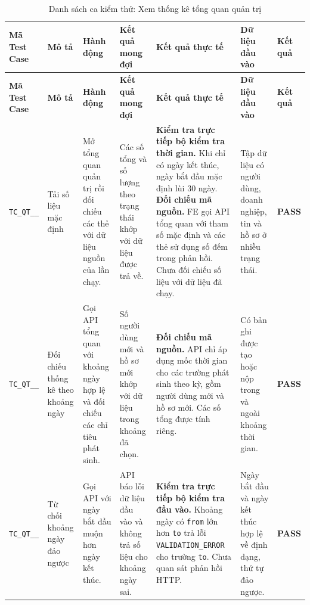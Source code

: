\begin{landscape}
{
\fontsize{9.5}{11.5}\selectfont
\setlength{\tabcolsep}{3pt}
\renewcommand{\arraystretch}{1.2}
\begin{longtable}{|>{\raggedright\arraybackslash}p{2.1cm}|>{\raggedright\arraybackslash}p{2.8cm}|>{\raggedright\arraybackslash}p{3.8cm}|>{\raggedright\arraybackslash}p{4.0cm}|>{\raggedright\arraybackslash}p{5.0cm}|>{\raggedright\arraybackslash}p{3.2cm}|>{\centering\arraybackslash}p{1.3cm}|}
    \caption{Danh sách ca kiểm thử: Xem thống kê tổng quan quản trị} \label{tab:ts-qt-04} \\
    \hline
    \textbf{Mã Test Case} & \textbf{Mô tả} & \textbf{Hành động} & \textbf{Kết quả mong đợi} & \textbf{Kết quả thực tế} & \textbf{Dữ liệu đầu vào} & \textbf{Kết quả} \\
    \hline
    \endfirsthead
    \hline
    \textbf{Mã Test Case} & \textbf{Mô tả} & \textbf{Hành động} & \textbf{Kết quả mong đợi} & \textbf{Kết quả thực tế} & \textbf{Dữ liệu đầu vào} & \textbf{Kết quả} \\
    \hline
    \endhead
    \hline
    \endfoot
    \hline
    \endlastfoot
    \texttt{TC\_\allowbreak QT\_\allowbreak 04\_\allowbreak 01} & Tải số liệu mặc định & Mở tổng quan quản trị rồi đối chiếu các thẻ với dữ liệu nguồn của lần chạy. & Các số tổng và số lượng theo trạng thái khớp với dữ liệu được trả về. & \textbf{Kiểm tra trực tiếp bộ kiểm tra thời gian.} Khi chỉ có ngày kết thúc, ngày bắt đầu mặc định lùi 30 ngày. \textbf{Đối chiếu mã nguồn.} FE gọi API tổng quan với tham số mặc định và các thẻ sử dụng số đếm trong phản hồi. Chưa đối chiếu số liệu với dữ liệu đã chạy. & Tập dữ liệu có người dùng, doanh nghiệp, tin và hồ sơ ở nhiều trạng thái. & \textbf{PASS} \\
    \hline
    \texttt{TC\_\allowbreak QT\_\allowbreak 04\_\allowbreak 02} & Đối chiếu thống kê theo khoảng ngày & Gọi API tổng quan với khoảng ngày hợp lệ và đối chiếu các chỉ tiêu phát sinh. & Số người dùng mới và hồ sơ mới khớp với dữ liệu trong khoảng đã chọn. & \textbf{Đối chiếu mã nguồn.} API chỉ áp dụng mốc thời gian cho các trường phát sinh theo kỳ, gồm người dùng mới và hồ sơ mới. Các số tổng được tính riêng. & Có bản ghi được tạo hoặc nộp trong và ngoài khoảng thời gian. & \textbf{PASS} \\
    \hline
    \texttt{TC\_\allowbreak QT\_\allowbreak 04\_\allowbreak 03} & Từ chối khoảng ngày đảo ngược & Gọi API với ngày bắt đầu muộn hơn ngày kết thúc. & API báo lỗi dữ liệu đầu vào và không trả số liệu cho khoảng ngày sai. & \textbf{Kiểm tra trực tiếp bộ kiểm tra đầu vào.} Khoảng ngày có \texttt{from} lớn hơn \texttt{to} trả lỗi \texttt{VALIDATION\_\allowbreak ERROR} cho trường \texttt{to}. Chưa quan sát phản hồi HTTP. & Ngày bắt đầu và ngày kết thúc hợp lệ về định dạng, thứ tự đảo ngược. & \textbf{PASS} \\

\end{longtable}}
\end{landscape}
